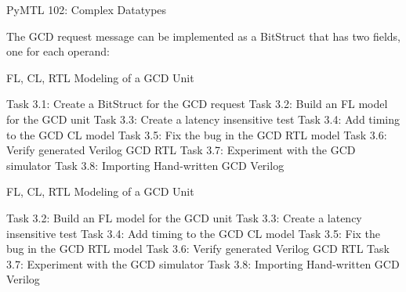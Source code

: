 \begin{frame}{PyMTL 102: Complex Datatypes}

The GCD request message can be implemented as a BitStruct that has two
fields, one for each operand:

\vspace{.2in}
\end{frame}


\begin{frame}{ FL, CL, RTL Modeling of a GCD Unit}
\begin{cbxlist}
  \1 Task 3.1: Create a BitStruct for the GCD request
  \1 Task 3.2: Build an FL model for the GCD unit
  \1 Task 3.3: Create a latency insensitive test
  \1 Task 3.4: Add timing to the GCD CL model
  \1 Task 3.5: Fix the bug in the GCD RTL model
  \1 Task 3.6: Verify generated Verilog GCD RTL
  \1 Task 3.7: Experiment with the GCD simulator
  \1 Task 3.8: Importing Hand-written GCD Verilog
\end{cbxlist}
\end{frame}

\begin{frame}{ FL, CL, RTL Modeling of a GCD Unit}
\begin{cbxlist}
  \1 
  \1 Task 3.2: Build an FL model for the GCD unit
  \1 Task 3.3: Create a latency insensitive test
  \1 Task 3.4: Add timing to the GCD CL model
  \1 Task 3.5: Fix the bug in the GCD RTL model
  \1 Task 3.6: Verify generated Verilog GCD RTL
  \1 Task 3.7: Experiment with the GCD simulator
  \1 Task 3.8: Importing Hand-written GCD Verilog
\end{cbxlist}
\end{frame}

